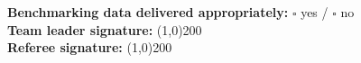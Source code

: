 \begin{flushleft}
\textbf{Benchmarking data delivered appropriately:} $\square$ yes / $\square$ no\\
\vspace{0.4cm}
\textbf{Team leader signature:} \line(1,0){200}\\
\vspace{0.4cm}
\textbf{Referee signature:} \line(1,0){200}
\end{flushleft}